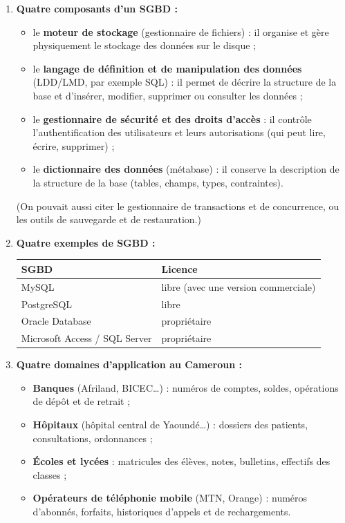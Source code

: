 \documentclass[11pt]{article}
\newcommand{\cle}[1]{{\popxbold\color{popdark}#1}}
\begin{document}
\begin{corrige}
\begin{enumerate}
\item \textbf{Quatre composants d'un SGBD :}
\begin{itemize}
\item le \textbf{moteur de stockage} (gestionnaire de fichiers) : il organise et gère physiquement le stockage des données sur le disque ;
\item le \textbf{langage de définition et de manipulation des données} (LDD/LMD, par exemple \cle{SQL}) : il permet de décrire la structure de la base et d'insérer, modifier, supprimer ou consulter les données ;
\item le \textbf{gestionnaire de sécurité et des droits d'accès} : il contrôle l'authentification des utilisateurs et leurs autorisations (qui peut lire, écrire, supprimer) ;
\item le \textbf{dictionnaire des données} (métabase) : il conserve la description de la structure de la base (tables, champs, types, contraintes).
\end{itemize}
(On pouvait aussi citer le gestionnaire de transactions et de concurrence, ou les outils de sauvegarde et de restauration.)
\item \textbf{Quatre exemples de SGBD :}
\begin{center}
\begin{tabular}{|l|l|}
\hline
\rowcolor{popblueL} \textbf{SGBD} & \textbf{Licence} \\
\hline
MySQL & libre (avec une version commerciale) \\
\hline
PostgreSQL & libre \\
\hline
Oracle Database & propriétaire \\
\hline
Microsoft Access / SQL Server & propriétaire \\
\hline
\end{tabular}
\end{center}
\item \textbf{Quatre domaines d'application au Cameroun :}
\begin{itemize}
\item \textbf{Banques} (Afriland, BICEC\dots) : numéros de comptes, soldes, opérations de dépôt et de retrait ;
\item \textbf{Hôpitaux} (hôpital central de Yaoundé\dots) : dossiers des patients, consultations, ordonnances ;
\item \textbf{Écoles et lycées} : matricules des élèves, notes, bulletins, effectifs des classes ;
\item \textbf{Opérateurs de téléphonie mobile} (MTN, Orange) : numéros d'abonnés, forfaits, historiques d'appels et de rechargements.
\end{itemize}
\end{enumerate}
\end{corrige}
\end{document}
